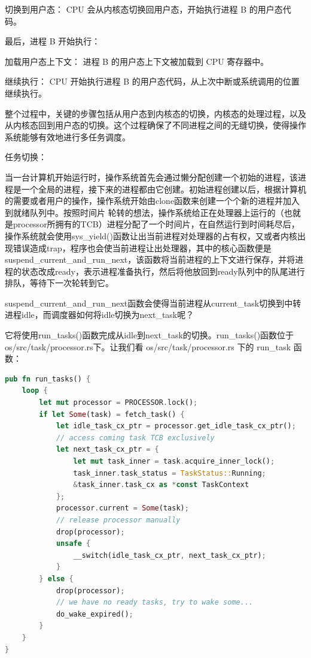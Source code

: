 \quad \textbullet 切换到用户态： CPU 会从内核态切换回用户态，开始执行进程 B 的用户态代码。

最后，进程 B 开始执行：

\quad \textbullet 加载用户态上下文： 进程 B 的用户态上下文被加载到 CPU 寄存器中。
	
\quad \textbullet 继续执行： CPU 开始执行进程 B 的用户态代码，从上次中断或系统调用的位置继续执行。

整个过程中，关键的步骤包括从用户态到内核态的切换，内核态的处理过程，以及从内核态回到用户态的切换。这个过程确保了不同进程之间的无缝切换，使得操作系统能够有效地进行多任务调度。

任务切换：

当一台计算机开始运行时，操作系统首先会通过懒分配创建一个初始的进程，该进程是一个全局的进程，接下来的进程都由它创建。初始进程创建以后，根据计算机的需要或者用户的操作，操作系统开始由clone函数来创建一个个新的进程并加入到就绪队列中。按照时间片
轮转的想法，操作系统给正在处理器上运行的（也就是processor所拥有的TCB）进程分配了一个时间片，在自然运行到时间耗尽后，操作系统就会使用sys_yield()函数让出当前进程对处理器的占有权，又或者内核出现错误造成trap，程序也会使当前进程让出处理器，其中的核心函数便是suspend_current_and_run_next，该函数将当前进程的上下文进行保存，并将进程的状态改成ready，表示进程准备执行，然后将他放回到ready队列中的队尾进行排队，等待下一次轮转到它。

suspend_current_and_run_next函数会使得当前进程从current_task切换到中转进程idle，而调度器如何将idle切换为next_task呢？

它将使用run_tasks()函数完成从idle到next_task的切换。run_tasks()函数位于os/src/task/processor.rs下。让我们看 os/src/task/processor.rs 下的 run_task 函数：
\begin{lstlisting}[language=rust,caption={run_task函数}]
    pub fn run_tasks() {
    loop {
        let mut processor = PROCESSOR.lock();
        if let Some(task) = fetch_task() {
            let idle_task_cx_ptr = processor.get_idle_task_cx_ptr();
            // access coming task TCB exclusively
            let next_task_cx_ptr = {
                let mut task_inner = task.acquire_inner_lock();
                task_inner.task_status = TaskStatus::Running;
                &task_inner.task_cx as *const TaskContext
            };
            processor.current = Some(task);
            // release processor manually
            drop(processor);
            unsafe {
                __switch(idle_task_cx_ptr, next_task_cx_ptr);
            }
        } else {
            drop(processor);
            // we have no ready tasks, try to wake some...
            do_wake_expired();
        }
    }
}
\end{lstlisting}

